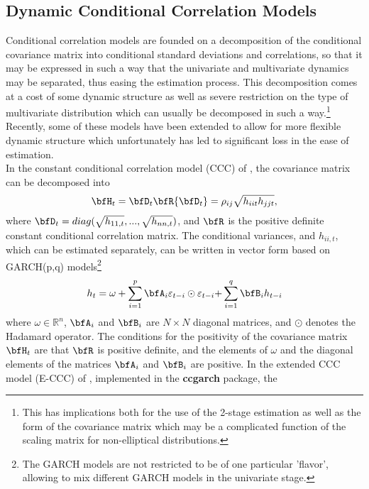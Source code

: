 \subsection{Dynamic Conditional Correlation Models}\label{section:dcc}
Conditional correlation models are founded on a decomposition of the conditional
covariance matrix into conditional standard deviations and correlations, so that
it may be expressed in such a way that the univariate and multivariate dynamics
may be separated, thus easing the estimation process. This decomposition comes
at a cost of some dynamic structure as well as severe restriction on the type
of multivariate distribution which can usually be decomposed in such a way.\footnote{
This has implications both for the use of the 2-stage estimation as well as the
form of the covariance matrix which may be a complicated function of the scaling
matrix for non-elliptical distributions.} Recently, some of these models have
been extended to allow for more flexible dynamic structure which unfortunately
has led to significant loss in the ease of estimation.\\
In the constant conditional correlation model (CCC) of \cite{Bollerslev1990},
the covariance matrix can be decomposed into
\begin{equation}\label{eq:dcc1}
{\bfH_t} = {\bfD_t}\bfR{\bfD_t} = {\rho _{ij}}\sqrt {{h_{iit}}{h_{jjt}}},
\end{equation}
where ${\bfD_t} = diag(\sqrt {{h_{11,t}}} ,...,\sqrt {{h_{nn,t}}} )$,
and $\bfR$ is the positive definite constant conditional correlation matrix.
The conditional variances, and $h_{ii,t}$, which can be estimated separately,
can be written in vector form based on GARCH(p,q) models\footnote{The GARCH
models are not restricted to be of one particular 'flavor', allowing to mix
different GARCH models in the univariate stage.}
\begin{equation}\label{eq:dcc2}
{h_t} = \omega  + \sum\limits_{i = 1}^p {{\bfA_i}{\varepsilon _{t - i}} \odot {\varepsilon _{t - i}} + } \sum\limits_{i = 1}^q {{\bfB_i}{h_{t - i}}}
\end{equation}
where $\omega  \in {\mathbb{R}^n}$, $\bfA_i$ and $\bfB_i$ are $N\times N$
diagonal matrices, and $\odot$ denotes the Hadamard operator. The conditions for
the positivity of the covariance matrix $\bfH_t$ are that $\bfR$ is positive
definite, and the elements of $\omega$ and the diagonal elements of the matrices
$\bfA_i$ and $\bfB_i$ are positive. In the extended CCC model (E-CCC) of
\cite{Jeantheau1998}, implemented in the {\bf ccgarch} package, the
